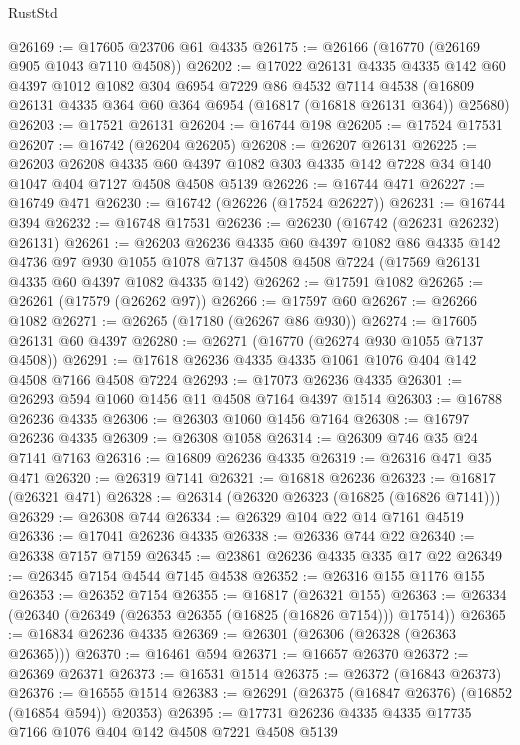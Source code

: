 \begin{lexlean}{RustStd}
\begin{coremodule}
@26169 := @17605 @23706 @61 @4335
@26175 := @26166 (@16770 (@26169 @905 @1043 @7110 @4508))
@26202 := @17022
    @26131
    @4335
    @4335
    @142
    @60
    @4397
    @1012
    @1082
    @304
    @6954
    @7229
    @86
    @4532
    @7114
    @4538
    (@16809 @26131 @4335 @364 @60 @364 @6954 (@16817 (@16818 @26131 @364)) @25680)
@26203 := @17521 @26131
@26204 := @16744 @198
@26205 := @17524 @17531
@26207 := @16742 (@26204 @26205)
@26208 := @26207 @26131
@26225 := @26203
    @26208
    @4335
    @60
    @4397
    @1082
    @303
    @4335
    @142
    @7228
    @34
    @140
    @1047
    @404
    @7127
    @4508
    @4508
    @5139
@26226 := @16744 @471
@26227 := @16749 @471
@26230 := @16742 (@26226 (@17524 @26227))
@26231 := @16744 @394
@26232 := @16748 @17531
@26236 := @26230 (@16742 (@26231 @26232) @26131)
@26261 := @26203
    @26236
    @4335
    @60
    @4397
    @1082
    @86
    @4335
    @142
    @4736
    @97
    @930
    @1055
    @1078
    @7137
    @4508
    @4508
    @7224
    (@17569 @26131 @4335 @60 @4397 @1082 @4335 @142)
@26262 := @17591 @1082
@26265 := @26261 (@17579 (@26262 @97))
@26266 := @17597 @60
@26267 := @26266 @1082
@26271 := @26265 (@17180 (@26267 @86 @930))
@26274 := @17605 @26131 @60 @4397
@26280 := @26271 (@16770 (@26274 @930 @1055 @7137 @4508))
@26291 := @17618 @26236 @4335 @4335 @1061 @1076 @404 @142 @4508 @7166 @4508 @7224
@26293 := @17073 @26236 @4335
@26301 := @26293 @594 @1060 @1456 @11 @4508 @7164 @4397 @1514
@26303 := @16788 @26236 @4335
@26306 := @26303 @1060 @1456 @7164
@26308 := @16797 @26236 @4335
@26309 := @26308 @1058
@26314 := @26309 @746 @35 @24 @7141 @7163
@26316 := @16809 @26236 @4335
@26319 := @26316 @471 @35 @471
@26320 := @26319 @7141
@26321 := @16818 @26236
@26323 := @16817 (@26321 @471)
@26328 := @26314 (@26320 @26323 (@16825 (@16826 @7141)))
@26329 := @26308 @744
@26334 := @26329 @104 @22 @14 @7161 @4519
@26336 := @17041 @26236 @4335
@26338 := @26336 @744 @22
@26340 := @26338 @7157 @7159
@26345 := @23861 @26236 @4335 @335 @17 @22
@26349 := @26345 @7154 @4544 @7145 @4538
@26352 := @26316 @155 @1176 @155
@26353 := @26352 @7154
@26355 := @16817 (@26321 @155)
@26363 := @26334 (@26340 (@26349 (@26353 @26355 (@16825 (@16826 @7154))) @17514))
@26365 := @16834 @26236 @4335
@26369 := @26301 (@26306 (@26328 (@26363 @26365)))
@26370 := @16461 @594
@26371 := @16657 @26370
@26372 := @26369 @26371
@26373 := @16531 @1514
@26375 := @26372 (@16843 @26373)
@26376 := @16555 @1514
@26383 := @26291 (@26375 (@16847 @26376) (@16852 (@16854 @594)) @20353)
@26395 := @17731 @26236 @4335 @4335 @17735 @7166 @1076 @404 @142 @4508 @7221 @4508 @5139

\end{coremodule}
\end{lexlean}
